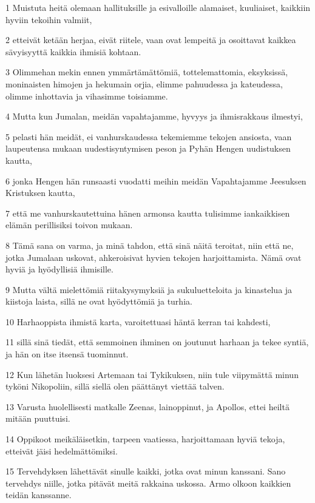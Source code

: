 \par 1 Muistuta heitä olemaan hallituksille ja esivalloille alamaiset, kuuliaiset, kaikkiin hyviin tekoihin valmiit,
\par 2 etteivät ketään herjaa, eivät riitele, vaan ovat lempeitä ja osoittavat kaikkea sävyisyyttä kaikkia ihmisiä kohtaan.
\par 3 Olimmehan mekin ennen ymmärtämättömiä, tottelemattomia, eksyksissä, moninaisten himojen ja hekumain orjia, elimme pahuudessa ja kateudessa, olimme inhottavia ja vihasimme toisiamme.
\par 4 Mutta kun Jumalan, meidän vapahtajamme, hyvyys ja ihmisrakkaus ilmestyi,
\par 5 pelasti hän meidät, ei vanhurskaudessa tekemiemme tekojen ansiosta, vaan laupeutensa mukaan uudestisyntymisen peson ja Pyhän Hengen uudistuksen kautta,
\par 6 jonka Hengen hän runsaasti vuodatti meihin meidän Vapahtajamme Jeesuksen Kristuksen kautta,
\par 7 että me vanhurskautettuina hänen armonsa kautta tulisimme iankaikkisen elämän perillisiksi toivon mukaan.
\par 8 Tämä sana on varma, ja minä tahdon, että sinä näitä teroitat, niin että ne, jotka Jumalaan uskovat, ahkeroisivat hyvien tekojen harjoittamista. Nämä ovat hyviä ja hyödyllisiä ihmisille.
\par 9 Mutta vältä mielettömiä riitakysymyksiä ja sukuluetteloita ja kinastelua ja kiistoja laista, sillä ne ovat hyödyttömiä ja turhia.
\par 10 Harhaoppista ihmistä karta, varoitettuasi häntä kerran tai kahdesti,
\par 11 sillä sinä tiedät, että semmoinen ihminen on joutunut harhaan ja tekee syntiä, ja hän on itse itsensä tuominnut.
\par 12 Kun lähetän luoksesi Artemaan tai Tykikuksen, niin tule viipymättä minun tyköni Nikopoliin, sillä siellä olen päättänyt viettää talven.
\par 13 Varusta huolellisesti matkalle Zeenas, lainoppinut, ja Apollos, ettei heiltä mitään puuttuisi.
\par 14 Oppikoot meikäläisetkin, tarpeen vaatiessa, harjoittamaan hyviä tekoja, etteivät jäisi hedelmättömiksi.
\par 15 Tervehdyksen lähettävät sinulle kaikki, jotka ovat minun kanssani. Sano tervehdys niille, jotka pitävät meitä rakkaina uskossa. Armo olkoon kaikkien teidän kanssanne.


